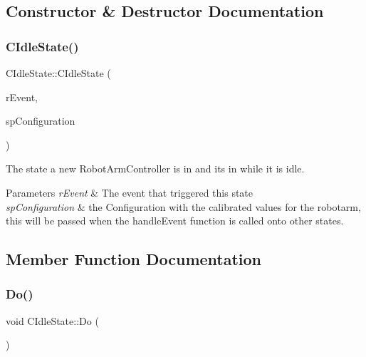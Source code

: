 \subsection{Constructor \& Destructor Documentation}
\mbox{\label{classCIdleState_a644c79b15da13871f33656e34ee30c45}} 
\subsubsection{\texorpdfstring{C\+Idle\+State()}{CIdleState()}}
{\footnotesize\ttfamily C\+Idle\+State\+::\+C\+Idle\+State (\begin{DoxyParamCaption}\item[{\hyperlink{classCEvent}{C\+Event} \&}]{r\+Event,  }\item[{std\+::shared\+\_\+ptr$<$ \hyperlink{classCConfiguration}{C\+Configuration} $>$}]{sp\+Configuration }\end{DoxyParamCaption})}



The state a new Robot\+Arm\+Controller is in and its in while it is idle. 


\begin{DoxyParams}{Parameters}
{\em r\+Event} & The event that triggered this state \\
\hline
{\em sp\+Configuration} & the Configuration with the calibrated values for the robotarm, this will be passed when the handle\+Event function is called onto other states. \\
\hline
\end{DoxyParams}


\subsection{Member Function Documentation}
\mbox{\label{classCIdleState_a7ae1fe9a96dfb78faaebd068bb8ecae7}} 
\subsubsection{\texorpdfstring{Do()}{Do()}}
{\footnotesize\ttfamily void C\+Idle\+State\+::\+Do (\begin{DoxyParamCaption}{ }\end{DoxyParamCaption})\hspace{0.3cm}{\ttfamily [virtual]}}



